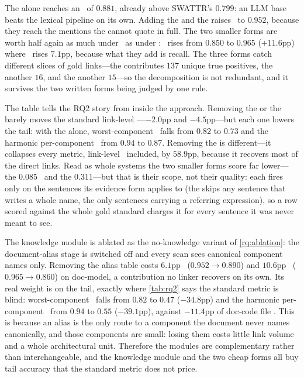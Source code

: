 The \linkerB{} alone reaches an \avgfone\ of $0.881$, already above SWATTR's $0.799$: an \ac{LLM} base beats the lexical pipeline on its own.
Adding the \linkerD{} and the \linkerC{} raises \avgfone\ to $0.952$, because they reach the mentions the \linkerB{} cannot quote in full.
The two smaller forms are worth half again as much under \ftwo\ as under \fone: \avgftwo\ rises from $0.850$ to $0.965$ ($+11.6$pp) where \avgfone\ rises $7.1$pp, because what they add is recall.
The three forms catch different slices of gold links---the \linkerB{} contributes $137$ unique true positives, the \linkerD{} another $16$, and the \linkerC{} another $15$---so the decomposition is not redundant, and it survives the two written forms being judged by one rule.

The table tells the RQ2 story from inside the approach.
Removing the \linkerD{} or the \linkerC{} barely moves the standard link-level \fone---$-2.0$pp and $-4.5$pp---but each one lowers the tail: with the \linkerB{} alone, worst-component \fone\ falls from $0.82$ to $0.73$ and the harmonic per-component \fone\ from $0.94$ to $0.87$.
Removing the \linkerB{} is different---it collapses every metric, link-level \fone\ included, by $58.9$pp, because it recovers most of the direct links.
Read as whole systems the two smaller forms score far lower---the \linkerD{} $0.085$ \avgfone\ and the \linkerC{} $0.311$---but that is their scope, not their quality: each fires only on the sentences its evidence form applies to (the \linkerD{} skips any sentence that writes a whole name, the \linkerC{} only sentences carrying a referring expression), so a row scored against the whole gold standard charges it for every sentence it was never meant to see.

The knowledge module is ablated as the no-knowledge variant of \ref{rq:ablation}: the document-alias stage is switched off and every scan sees canonical component names only.
Removing the alias table costs $6.1$pp \avgfone\ ($0.952 \rightarrow 0.890$) and $10.6$pp \avgftwo\ ($0.965 \rightarrow 0.860$) on doc-model, a contribution no linker recovers on its own.
Its real weight is on the tail, exactly where \autoref{tab:rq2} says the standard metric is blind: worst-component \fone\ falls from $0.82$ to $0.47$ ($-34.8$pp) and the harmonic per-component \fone\ from $0.94$ to $0.55$ ($-39.1$pp), against $-11.4$pp of doc-code file \fone.
This is because an alias is the only route to a component the document never names canonically, and those components are small: losing them costs little link volume and a whole architectural unit.
Therefore the modules are complementary rather than interchangeable, and the knowledge module and the two cheap forms all buy tail accuracy that the standard metric does not price.

